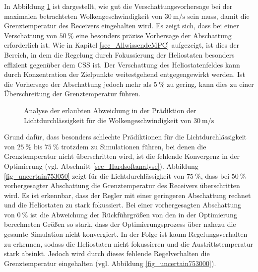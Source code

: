 In Abbildung \ref{fig_shadingsafe} ist dargestellt, wie gut die Verschattungsvorhersage bei der maximalen betrachteten Wolkengeschwindigkeit von $\SI{30}{\metre\per\second}$ sein muss, damit die Grenztemperatur des Receivers eingehalten wird.
Es zeigt sich, dass bei einer Verschattung von $\SI{50}{\percent}$ eine besonders präzise Vorhersage der Abschattung erforderlich ist.
Wie in Kapitel \ref{sec_AllwissendeMPC} aufgezeigt, ist dies der Bereich, in dem die Regelung durch Fokussierung der Heliostaten besonders effizient gegenüber dem CSS ist.
Der Verschattung des Heliostatenfeldes kann durch Konzentration der Zielpunkte weitestgehend entgegengewirkt werden.
Ist die Vorhersage der Abschattung jedoch mehr als $\SI{5}{\percent}$ zu gering, kann dies zu einer Überschreitung der Grenztemperatur führen.

\enlargethispage{\baselineskip}
\begin{figure}[h!]
    \centering
    \setlength{\fboxsep}{1pt}
    \setlength{\fboxrule}{1pt}
\caption[Analyse der erlaubten Abweichung in der Prädiktion der Lichtdurchlässigkeit für die Wolkengeschwindigkeit von $\SI{30}{\metre\per\second}$]{Analyse der erlaubten Abweichung in der Prädiktion der Lichtdurchlässigkeit für die Wolkengeschwindigkeit von $\SI{30}{\metre\per\second}$}
    \label{fig_shadingsafe}
\end{figure}

Grund dafür, dass besonders schlechte Prädiktionen für die Lichtdurchlässigkeit von $\SI{25}{\percent}$ bis $\SI{75}{\percent}$ trotzdem zu Simulationen führen, bei denen die Grenztemperatur nicht überschritten wird, ist die fehlende Konvergenz in der Optimierung (vgl. Abschnitt \ref{sec_Hardsoftanalyse}).\linebreak
Abbildung \ref{fig_uncertain753050} zeigt für die Lichtdurchlässigkeit von $\SI{75}{\percent}$, dass bei $\SI{50}{\percent}$ vorhergesagter Abschattung die Grenztemperatur des Receivers überschritten wird.
Es ist erkennbar, dass der Regler mit einer geringeren Abschattung rechnet und die Heliostaten zu stark fokussiert.
Bei einer vorhergesagten Abschattung von $\SI{0}{\percent}$ ist die Abweichung der Rückführgrößen von den in der Optimierung berechneten Größen so stark, dass der Optimierungsprozess über nahezu die gesamte Simulation nicht konvergiert.
In der Folge ist kaum Regelungsverhalten zu erkennen, sodass die Heliostaten nicht fokussieren und die Austrittstemperatur stark absinkt.
Jedoch wird durch dieses fehlende Regelverhalten die Grenztemperatur eingehalten (vgl. Abbildung \ref{fig_uncertain753000}).

